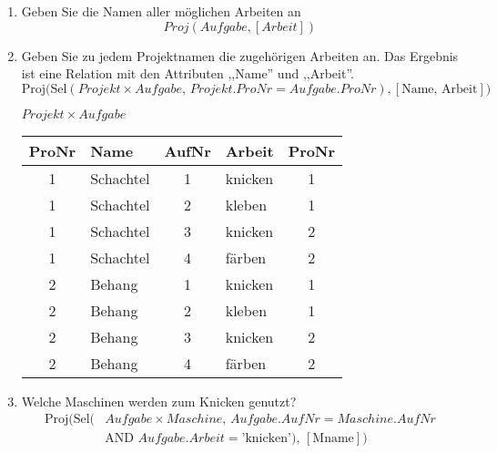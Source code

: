 \begin{enumerate}
    \item Geben Sie die Namen aller möglichen Arbeiten an \\ \[Proj(Aufgabe, [Arbeit])\]
    \item Geben Sie zu jedem Projektnamen die zugehörigen Arbeiten an. Das Ergebnis ist eine Relation mit den Attributen ,,Name'' und ,,Arbeit''. 
                \[
                    \text{Proj}\bigl(
                    \text{Sel}(Projekt \times Aufgabe,\, Projekt.ProNr = Aufgabe.ProNr),
                    [\text{Name, Arbeit}]
                    \bigr)
                    \]
            \begin{tcolorbox}[blue, title={Przykład dla Kreuzprodukt $Projekt \times Aufgabe$}]
                \begin{table}[H]
                    \centering
                    \textbf{$Projekt \times Aufgabe$} \\[6pt]
                    \begin{tabular}{|c|l|c|l|c|}
                        \hline
                        \textbf{ProNr} & \textbf{Name} & \textbf{AufNr} & \textbf{Arbeit} & \textbf{ProNr} \\
                        \hline
                        1 & Schachtel & 1 & knicken & 1 \\
                        1 & Schachtel & 2 & kleben  & 1 \\
                        1 & Schachtel & 3 & knicken & 2 \\
                        1 & Schachtel & 4 & färben  & 2 \\
                        2 & Behang    & 1 & knicken & 1 \\
                        2 & Behang    & 2 & kleben  & 1 \\
                        2 & Behang    & 3 & knicken & 2 \\
                        2 & Behang    & 4 & färben  & 2 \\
                        \hline
                    \end{tabular}
                \end{table}
            \end{tcolorbox}
    \item Welche Maschinen werden zum Knicken genutzt?
                \begin{align*}
                    \text{Proj}\bigl(
                    \text{Sel}(&Aufgabe \times Maschine,\,
                    Aufgabe.AufNr = Maschine.AufNr \\
                    & \text{AND } Aufgabe.Arbeit = \text{'knicken'}),\,
                    [\text{Mname}]
                    \bigr)
                \end{align*}


\end{enumerate}
